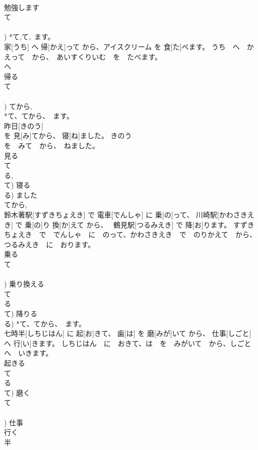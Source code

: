 \documentclass[8pt]{extreport}
\begin{document}
\begin{CJK}{UTF8}{min}
\\	勉強します 
\\	て 
\\	[する] 
\\	[して])	*て,て,~ます。 
\\	家[うち] へ 帰[かえ]って から、アイスクリーム を 食[た]べます。	うち　へ　かえって　から、　あいすくりいむ　を　たべます。	
\\	へ 
\\	帰る 
\\	て 
\\	[る/つ/う] 
\\	[って])	てから, 
\\	*て、てから、~ます。 
\\	昨日[きのう] 
\\	を 見[み]てから、 寝[ね]ました。	きのう　
\\	を　みて　から、　ねました。	
\\	見る 
\\	て 
\\	る, 
\\	て)	寝る 
\\	る)	ました 
\\	てから, 
\\	鈴木著駅[すずきちょえき] で 電車[でんしゃ] に 乗[の]って、 川崎駅[かわさきえき] で 乗[の]り 換[か]えて から、　 鶴見駅[つるみえき] で 降[お]ります。	すずきちょえき　で　でんしゃ　に　のって、かわさきえき　で　のりかえて　から、つるみえき　に　おります。	
\\	乗る 
\\	て 
\\	[る/つ/う] 
\\	[って])	乗り換える 
\\	て 
\\	る 
\\	て)	降りる 
\\	る)	*て、てから、~ます。 
\\	七時半[しちじはん] に 起[お]きて、 歯[は] を 磨[みが]いて から、 仕事[しごと] へ 行[い]きます。	しちじはん　に　おきて、は　を　みがいて　から、しごと　へ　いきます。	
\\	起きる 
\\	て 
\\	る 
\\	て)	磨く 
\\	て 
\\	[く/ぐ] 
\\	[いて/いで])	仕事 
\\	行く 
\\	半 

\end{CJK}
\end{document}
